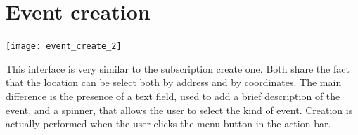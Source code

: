 \documentclass[a4paper]{scrreprt}
\begin{document}
\section{Event creation}
\begin{minipage}{0.5\textwidth}
	\centering
	\texttt{[image: event\_create\_2]}
\end{minipage}
\begin{minipage}{0.5\textwidth}
	This interface is very similar to the subscription create one. Both share the fact that the location can be select both by address and by coordinates. The main difference is the presence of a text field, used to add a brief description of the event, and a spinner, that allows the user to select the kind of event. Creation is actually performed when the user clicks the menu button in the action bar.
\end{minipage}
\end{document}
